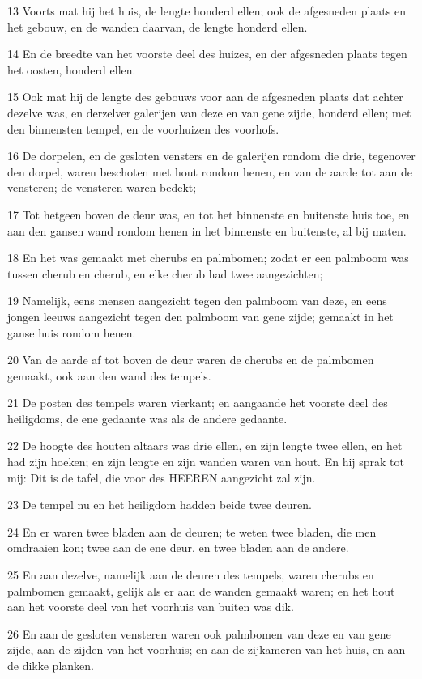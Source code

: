 \par 13 Voorts mat hij het huis, de lengte honderd ellen; ook de afgesneden plaats en het gebouw, en de wanden daarvan, de lengte honderd ellen.
\par 14 En de breedte van het voorste deel des huizes, en der afgesneden plaats tegen het oosten, honderd ellen.
\par 15 Ook mat hij de lengte des gebouws voor aan de afgesneden plaats dat achter dezelve was, en derzelver galerijen van deze en van gene zijde, honderd ellen; met den binnensten tempel, en de voorhuizen des voorhofs.
\par 16 De dorpelen, en de gesloten vensters en de galerijen rondom die drie, tegenover den dorpel, waren beschoten met hout rondom henen, en van de aarde tot aan de vensteren; de vensteren waren bedekt;
\par 17 Tot hetgeen boven de deur was, en tot het binnenste en buitenste huis toe, en aan den gansen wand rondom henen in het binnenste en buitenste, al bij maten.
\par 18 En het was gemaakt met cherubs en palmbomen; zodat er een palmboom was tussen cherub en cherub, en elke cherub had twee aangezichten;
\par 19 Namelijk, eens mensen aangezicht tegen den palmboom van deze, en eens jongen leeuws aangezicht tegen den palmboom van gene zijde; gemaakt in het ganse huis rondom henen.
\par 20 Van de aarde af tot boven de deur waren de cherubs en de palmbomen gemaakt, ook aan den wand des tempels.
\par 21 De posten des tempels waren vierkant; en aangaande het voorste deel des heiligdoms, de ene gedaante was als de andere gedaante.
\par 22 De hoogte des houten altaars was drie ellen, en zijn lengte twee ellen, en het had zijn hoeken; en zijn lengte en zijn wanden waren van hout. En hij sprak tot mij: Dit is de tafel, die voor des HEEREN aangezicht zal zijn.
\par 23 De tempel nu en het heiligdom hadden beide twee deuren.
\par 24 En er waren twee bladen aan de deuren; te weten twee bladen, die men omdraaien kon; twee aan de ene deur, en twee bladen aan de andere.
\par 25 En aan dezelve, namelijk aan de deuren des tempels, waren cherubs en palmbomen gemaakt, gelijk als er aan de wanden gemaakt waren; en het hout aan het voorste deel van het voorhuis van buiten was dik.
\par 26 En aan de gesloten vensteren waren ook palmbomen van deze en van gene zijde, aan de zijden van het voorhuis; en aan de zijkameren van het huis, en aan de dikke planken.

